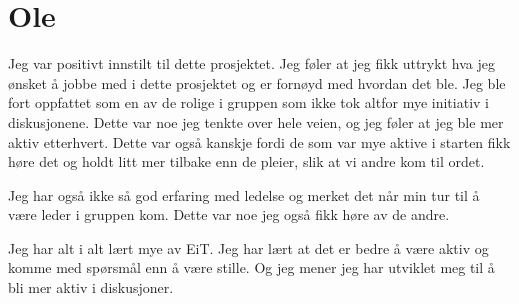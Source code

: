 \section{Ole}
Jeg var positivt innstilt til dette prosjektet. Jeg føler at jeg fikk uttrykt hva jeg ønsket å jobbe med i dette prosjektet og er fornøyd med hvordan det ble.
Jeg ble fort oppfattet som en av de rolige i gruppen som ikke tok altfor mye initiativ i diskusjonene. 
Dette var noe jeg tenkte over hele veien, og jeg føler at jeg ble mer aktiv etterhvert. 
Dette var også kanskje fordi de som var mye aktive i starten fikk høre det og holdt litt mer tilbake enn de pleier, slik at vi andre kom til ordet.

Jeg har også ikke så god erfaring med ledelse og merket det når min tur til å være leder i gruppen kom. Dette var noe jeg også fikk høre av de andre.

Jeg har alt i alt lært mye av EiT. Jeg har lært at det er bedre å være aktiv og komme med spørsmål enn å være stille. Og jeg mener jeg har utviklet meg til å bli mer aktiv i diskusjoner.
